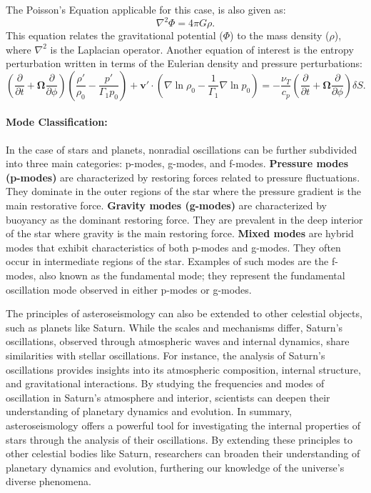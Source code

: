 \documentclass{article}
\begin{document}
The Poisson's Equation applicable for this case, is also given as\cite{Carroll_Ostlie_2017, unno1989nonradial}:
\begin{equation}
\nabla^2 \Phi = 4\pi G \rho.
\end{equation}
This equation relates the gravitational potential (\(\Phi\)) to the mass density (\(\rho\)), where \(\nabla^2\) is the Laplacian operator. Another equation of interest is the entropy perturbation written in terms of the Eulerian density and pressure perturbations\cite{1983psen.book.....C, unno1989nonradial}:
\begin{equation}
    \left( \frac{\partial}{\partial t} + \mathbf{\Omega} \frac{\partial}{\partial \phi} \right)\left( \frac{\rho'}{\rho_{0}} - \frac{p'}{\Gamma_{1}p_{0}} \right) + {\mathbf{v'}} \cdot \left( \nabla \ln \rho_{0} - \frac{1}{\Gamma_{1}} \nabla \ln p_{0} \right) = -\frac{\nu_{T}}{c_{p}}\left( \frac{\partial}{\partial t} + \mathbf{\Omega} \frac{\partial}{\partial \phi} \right) \delta S.
\end{equation}
\paragraph{Mode Classification:}

In the case of stars and planets, nonradial oscillations can be further subdivided into three main categories: p-modes, g-modes, and f-modes. \textbf{Pressure modes (p-modes)} are characterized by restoring forces related to pressure fluctuations. They dominate in the outer regions of the star where the pressure gradient is the main restorative force. \textbf{Gravity modes (g-modes)} are characterized by buoyancy as the dominant restoring force. They are prevalent in the deep interior of the star where gravity is the main restoring force. \textbf{Mixed modes} are hybrid modes that exhibit characteristics of both p-modes and g-modes. They often occur in intermediate regions of the star\cite{unno1989nonradial}. Examples of such modes are the f-modes, also known as the fundamental mode; they represent the fundamental oscillation mode observed in either p-modes or g-modes.

The principles of asteroseismology can also be extended to other celestial objects, such as planets like Saturn. While the scales and mechanisms differ, Saturn's oscillations, observed through atmospheric waves and internal dynamics, share similarities with stellar oscillations. For instance, the analysis of Saturn's oscillations provides insights into its atmospheric composition, internal structure, and gravitational interactions. By studying the frequencies and modes of oscillation in Saturn's atmosphere and interior, scientists can deepen their understanding of planetary dynamics and evolution. In summary, asteroseismology offers a powerful tool for investigating the internal properties of stars through the analysis of their oscillations. By extending these principles to other celestial bodies like Saturn, researchers can broaden their understanding of planetary dynamics and evolution, furthering our knowledge of the universe's diverse phenomena.
\end{document}
